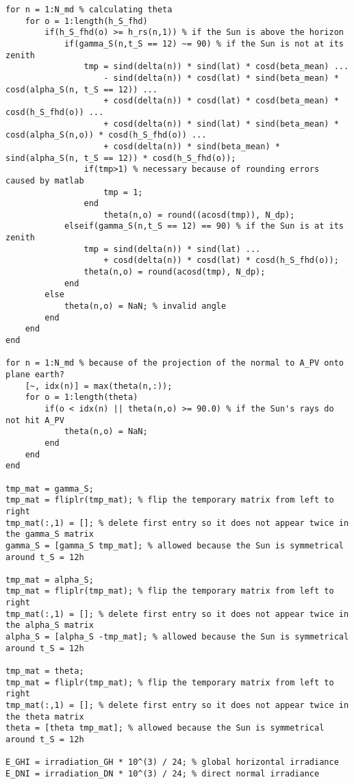 \begin{lstlisting}
for n = 1:N_md % calculating theta
    for o = 1:length(h_S_fhd)
        if(h_S_fhd(o) >= h_rs(n,1)) % if the Sun is above the horizon
            if(gamma_S(n,t_S == 12) ~= 90) % if the Sun is not at its zenith
                tmp = sind(delta(n)) * sind(lat) * cosd(beta_mean) ...
                    - sind(delta(n)) * cosd(lat) * sind(beta_mean) * cosd(alpha_S(n, t_S == 12)) ...
                    + cosd(delta(n)) * cosd(lat) * cosd(beta_mean) * cosd(h_S_fhd(o)) ...
                    + cosd(delta(n)) * sind(lat) * sind(beta_mean) * cosd(alpha_S(n,o)) * cosd(h_S_fhd(o)) ...
                    + cosd(delta(n)) * sind(beta_mean) * sind(alpha_S(n, t_S == 12)) * cosd(h_S_fhd(o));
                if(tmp>1) % necessary because of rounding errors caused by matlab
                    tmp = 1;
                end 
                    theta(n,o) = round((acosd(tmp)), N_dp);      
            elseif(gamma_S(n,t_S == 12) == 90) % if the Sun is at its zenith
                tmp = sind(delta(n)) * sind(lat) ... 
                    + cosd(delta(n)) * cosd(lat) * cosd(h_S_fhd(o));
                theta(n,o) = round(acosd(tmp), N_dp);
            end
        else
            theta(n,o) = NaN; % invalid angle
        end
    end
end

for n = 1:N_md % because of the projection of the normal to A_PV onto plane earth?
    [~, idx(n)] = max(theta(n,:));
    for o = 1:length(theta)
        if(o < idx(n) || theta(n,o) >= 90.0) % if the Sun's rays do not hit A_PV
            theta(n,o) = NaN;
        end
    end
end

tmp_mat = gamma_S;
tmp_mat = fliplr(tmp_mat); % flip the temporary matrix from left to right
tmp_mat(:,1) = []; % delete first entry so it does not appear twice in the gamma_S matrix
gamma_S = [gamma_S tmp_mat]; % allowed because the Sun is symmetrical around t_S = 12h

tmp_mat = alpha_S;
tmp_mat = fliplr(tmp_mat); % flip the temporary matrix from left to right
tmp_mat(:,1) = []; % delete first entry so it does not appear twice in the alpha_S matrix
alpha_S = [alpha_S -tmp_mat]; % allowed because the Sun is symmetrical around t_S = 12h

tmp_mat = theta;
tmp_mat = fliplr(tmp_mat); % flip the temporary matrix from left to right
tmp_mat(:,1) = []; % delete first entry so it does not appear twice in the theta matrix
theta = [theta tmp_mat]; % allowed because the Sun is symmetrical around t_S = 12h

E_GHI = irradiation_GH * 10^(3) / 24; % global horizontal irradiance 
E_DNI = irradiation_DN * 10^(3) / 24; % direct normal irradiance


\end{lstlisting}

